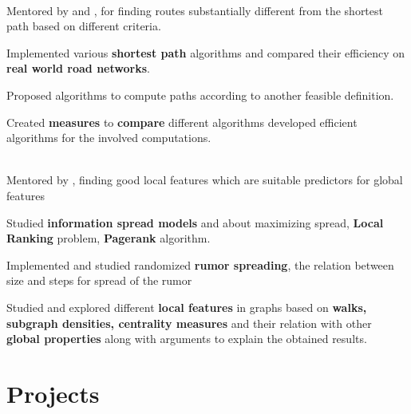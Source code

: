 \documentclass[a4paper]{norm-resume}
\begin{document}
	\begin{changemargin}{1.0cm}{0.0cm} 
	{
	\large{}  \\
	\small{Mentored by  and , for finding routes substantially different from the shortest path based on different criteria.} 
	\begin{tightitemize}
	\small
	{
	\item Implemented various \textbf{shortest path} algorithms and compared their efficiency on \textbf{real world road networks}.
	\item Proposed algorithms to compute paths according to another feasible definition.
	\item Created \textbf{measures} to \textbf{compare} different algorithms developed efficient algorithms for the involved computations.
	}
	\end{tightitemize}
	
\vspace{1mm} %
			
	\large{} \\
	\small{Mentored by , finding good local features which are suitable predictors for global features}
	\begin{tightitemize}
	\small
	{
	\item Studied \textbf{information spread models} and about maximizing spread, \textbf{Local Ranking} problem, \textbf{Pagerank} algorithm. 
	\item Implemented and studied randomized \textbf{rumor spreading}, the relation between size and steps for spread of the rumor
	\item Studied and explored different \textbf{local features} in graphs based on \textbf{walks, subgraph densities, centrality measures} and their relation with other \textbf{global properties} along with arguments to explain the obtained results.
	}
	\end{tightitemize}
 	
	}
	\end{changemargin} 	

\vspace{0mm}	%


\section{Projects \hrulefill}
\end{document}
